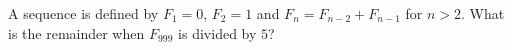 A sequence is defined by $F_1=0$, $F_2=1$ and $F_n=F_{n-2}+F_{n-1}$ for $n>2$. What is the remainder when $F_{999}$ is divided by $5$?
